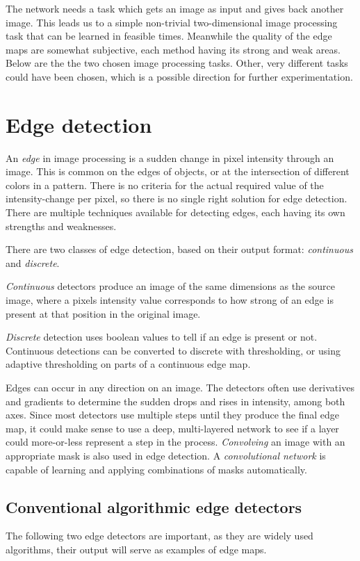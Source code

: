 \documentclass[12pt]{report}
\begin{document}
The network needs a task which gets an image as input and gives back another image. This leads us to a simple non-trivial two-dimensional image processing task that can be learned in feasible times. Meanwhile the quality of the edge maps are somewhat subjective, each method having its strong and weak areas. Below are the the two chosen image processing tasks. Other, very different tasks could have been chosen, which is a possible direction for further experimentation.
\section{Edge detection}
An \textit{edge} in image processing is a sudden change in pixel intensity through an image. This is common on the edges of objects, or at the intersection of different colors in a pattern. There is no criteria for the actual required value of the intensity-change per pixel, so there is no single right solution for edge detection. There are multiple techniques available for detecting edges, each having its own strengths and weaknesses.\par

There are two classes of edge detection, based on their output format: \textit{continuous} and \textit{discrete}.\par

\textit{Continuous} detectors produce an image of the same dimensions as the source image, where a pixels intensity value corresponds to how strong of an edge is present at that position in the original image.\par

\textit{Discrete} detection uses boolean values to tell if an edge is present or not. Continuous detections can be converted to discrete with thresholding, or using adaptive thresholding on parts of a continuous edge map.\par

Edges can occur in any direction on an image. The detectors often use derivatives and gradients to determine the sudden drops and rises in intensity, among both axes. Since most detectors use multiple steps until they produce the final edge map, it could make sense to use a deep, multi-layered network to see if a layer could more-or-less represent a step in the process. \textit{Convolving} an image with an appropriate mask is also used in edge detection. A \textit{convolutional network} is capable of learning and applying combinations of masks automatically.
\subsection{Conventional algorithmic edge detectors}
The following two edge detectors are important, as they are widely used algorithms, their output will serve as examples of edge maps.\par
\end{document}
